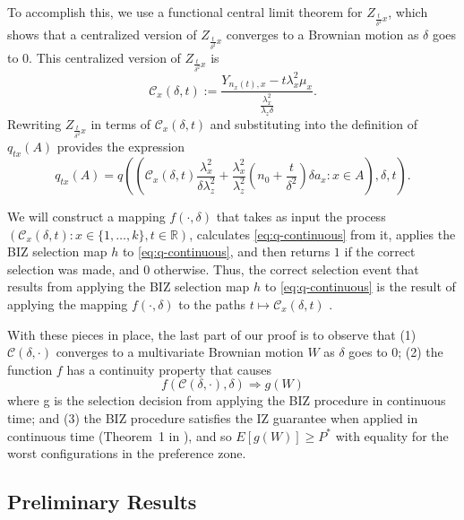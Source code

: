 \documentclass{wscpaperproc}
\theoremstyle{wsc}
\begin{document}
To accomplish this, we use a functional central limit theorem for
$Z_{\frac{t}{\delta^{2}}x}$, which shows that a centralized
version of $Z_{\frac{t}{\delta^{2}}x}$ converges to a Brownian motion as $\delta$ goes to $0$.
This centralized version of $Z_{\frac{t}{\delta^{2}}x}$ is 
\[
\mathcal{C}_{x}\left(\delta,t\right):=\frac{Y_{n_{x}\left(t\right),x}-t\lambda_{x}^{2}\mu_{x}}{\frac{\lambda_{x}^{2}}{\lambda_{z}\delta}}.
\]
Rewriting $Z_{\frac{t}{\delta^{2}}x}$ in terms of $\mathcal{C}_{x}\left(\delta,t\right)$ and substituting into the definition of $q_{tx}(A)$ provides the expression
\begin{equation}
    q_{tx}\left(A\right)=q\left(\left(\mathcal{C}_{x}\left(\delta,t\right)\frac{\lambda_{x}^{2}}{\delta\lambda_{z}^{2}}+\frac{\lambda_{x}^{2}}{\lambda_{z}^{2}}\left(n_{0}+\frac{t}{\delta^{2}}\right)\delta a_{x}:x\in A\right),\delta,t \right).
    \label{eq:q}
\end{equation}

We will construct a mapping $f\left(\cdot,\delta\right)$ that takes as input the process
$\left(\mathcal{C}_{x}\left(\delta,t\right) : x\in \{1,\ldots,k\}, t\in\mathbb{R}\right)$,
calculates 
\eqref{eq:q-continuous}
from it,
applies the BIZ selection map $h$ to \eqref{eq:q-continuous}, 
and then returns $1$ if the correct selection was made,
and $0$ otherwise.
Thus, the correct selection event that results from applying
the BIZ selection map $h$ to \eqref{eq:q-continuous} is the result
of applying the mapping $f\left(\cdot,\delta\right)$
to the paths $t\mapsto\mathcal{C}_{x}\left(\delta,t\right)$ .



With these pieces in place, the last part of our proof is to observe that (1) $\mathcal{C}\left(\delta,\cdot\right)$
converges to a multivariate Brownian motion $W$ as $\delta$ goes
to 0; (2) the function $f$ has a continuity property that causes
\[
f\left(\mathcal{C}\left(\delta,\cdot\right),\delta\right)\Rightarrow g\left(W\right)
\]
where g is the selection decision from applying the BIZ procedure
in continuous time; and (3) the BIZ procedure satisfies the IZ guarantee
when applied in continuous time (Theorem~1 in \cite{Frazier:BIZ}), and so $E[g(W)] \ge P^*$ with equality for the worst configurations in the preference zone.

\subsection{Preliminary Results}
\end{document}
